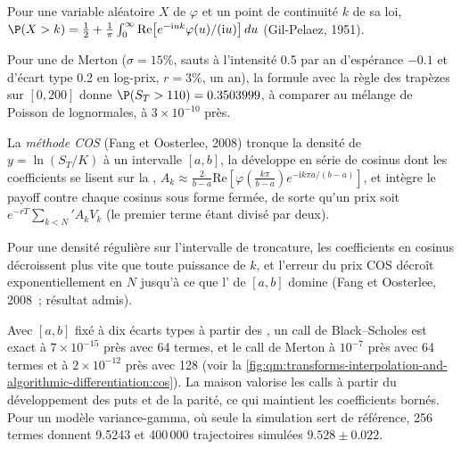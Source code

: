 \begin{proposition}\label{prop:qm:transforms-interpolation-and-algorithmic-differentiation:gp}
Pour une variable aléatoire $X$ de  $\varphi$ et un point de continuité $k$ de sa loi, $\P(X > k) = \frac12 + \frac1\pi\int_0^\infty\mathrm{Re}\bigl[e^{-\mathrm iuk}\varphi(u)/(\mathrm iu)\bigr]\,du$
(Gil-Pelaez, 1951).
\end{proposition}

Pour une  de Merton ($\sigma = 15\%$, sauts à l'intensité 0.5 par an d'espérance $-0.1$ et d'écart type 0.2 en log-prix, $r = 3\%$, un an), la formule avec la règle des trapèzes sur $[0, 200]$ donne
$\P(S_T > 110) = 0.3503999$, à comparer au mélange de Poisson de lognormales, à $3 \times 10^{-10}$ près.

\begin{definition}\label{def:qm:transforms-interpolation-and-algorithmic-differentiation:cos}
La \emph{méthode COS} (Fang et Oosterlee, 2008) tronque la densité de $y = \ln(S_T/K)$ à un intervalle $[a, b]$, la développe en série de cosinus dont les coefficients se lisent sur la
, $A_k \approx \frac2{b-a}\mathrm{Re}[\varphi(\frac{k\pi}{b-a})e^{-\mathrm ik\pi a/(b-a)}]$, et intègre le payoff contre chaque cosinus sous forme fermée, de sorte qu'un prix soit
$e^{-rT}\sum_{k<N}{}'A_kV_k$ (le premier terme étant divisé par deux).
\end{definition}

\begin{proposition}\label{prop:qm:transforms-interpolation-and-algorithmic-differentiation:cosconv}
Pour une densité régulière sur l'intervalle de troncature, les coefficients en cosinus décroissent plus vite que toute puissance de $k$, et l'erreur du prix COS décroît exponentiellement en $N$ jusqu'à ce que l'
de $[a, b]$ domine (Fang et Oosterlee, 2008~; résultat admis).
\end{proposition}

Avec $[a, b]$ fixé à dix écarts types à partir des , un call de Black--Scholes est exact à $7 \times 10^{-15}$ près avec 64 termes, et le call de Merton à $10^{-7}$ près avec 64 termes et à $2 \times 10^{-12}$ près avec 128
(voir la \cref{fig:qm:transforms-interpolation-and-algorithmic-differentiation:cos}). La maison valorise les calls à partir du développement des puts et de la parité, ce qui maintient les coefficients bornés. Pour un modèle variance-gamma,
où seule la simulation sert de référence, 256 termes donnent 9.5243 et 400\,000 trajectoires simulées $9.528 \pm 0.022$.

